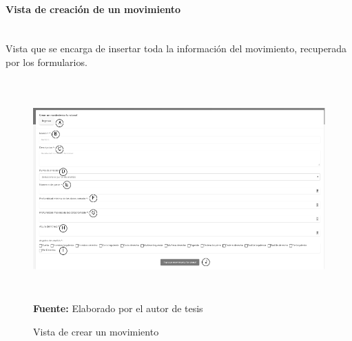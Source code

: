 \paragraph{Vista de creaci\'on de un movimiento}\mbox{} \\ \label{ins:UI:web:create}
Vista que se encarga de insertar toda la informaci\'on del movimiento, recuperada por los formularios.
\begin{figure}[H]
	\caption{Vista de crear un movimiento}
	\label{fig:viewCreate}
	\centering
	\includegraphics[width=460px,height=320px]{graphics/web-create.PNG} \\
	\textbf{Fuente:} Elaborado por el autor de tesis
\end{figure}
